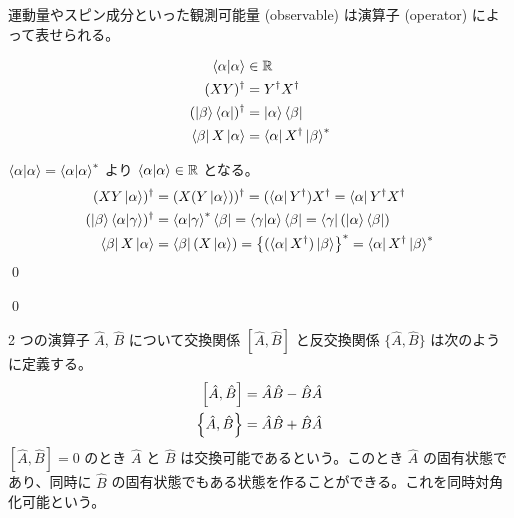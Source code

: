 \documentclass[uplatex,dvipdfmx,a4paper,11pt]{jlreq}
\makeatletter
\newcommand{\RR}{\mathbb{R}}
\theoremstyle{definition}
\renewenvironment{proof}[1][\proofname]{\par
  \normalfont
  \topsep6\p@\@plus6\p@ \trivlist
  \item[\hskip\labelsep{\bfseries #1}\@addpunct{\bfseries}]\ignorespaces\quad\par
}{%
  \qed\endtrivlist\@endpefalse
}
\renewcommand\proofname{証明}
\makeatother
\begin{document}
\begin{axiom}
  運動量やスピン成分といった観測可能量 (observable) は演算子 (operator) によって表せられる。
\end{axiom}

\begin{proposition}
  \begin{align}
    \braket{\alpha|\alpha}            & \in\RR                               \\
    (XY)^\dagger                      & = Y^\dagger X^\dagger                \\
    (\ket{\beta}\bra{\alpha})^\dagger & = \ket{\alpha}\bra{\beta}            \\
    \bra{\beta}X\ket{\alpha}          & = \bra{\alpha}X^\dagger\ket{\beta}^*
  \end{align}
\end{proposition}
\begin{proof}
  $\braket{\alpha|\alpha} = \braket{\alpha|\alpha}^*$ より $\braket{\alpha|\alpha}\in\RR$ となる。
  \begin{align}
    (XY\ket{\alpha})^\dagger                    & = (X(Y\ket{\alpha}))^\dagger = (\bra{\alpha}Y^\dagger)X^\dagger = \bra{\alpha}Y^\dagger X^\dagger                 \\
    (\ket{\beta}\braket{\alpha|\gamma})^\dagger & = \braket{\alpha|\gamma}^*\bra{\beta} = \braket{\gamma|\alpha}\bra{\beta} = \bra{\gamma}(\ket{\alpha}\bra{\beta}) \\
    \bra{\beta}X\ket{\alpha}                    & = \bra{\beta}(X\ket{\alpha}) = \qty{(\bra{\alpha}X^\dagger)\ket{\beta}}^* = \bra{\alpha}X^\dagger\ket{\beta}^*
  \end{align}
\end{proof}

\begin{theorem}[エルミート演算子の固有ケットの直交性]
\end{theorem}
\begin{proof}

\end{proof}

\begin{definition}
  2 つの演算子 $\hat{A}$, $\hat{B}$ について交換関係 $[\hat{A}, \hat{B}]$ と反交換関係 $\lbrace\hat{A}, \hat{B}\rbrace$ は次のように定義する。
  \begin{align}
    \qty[\hat{A}, \hat{B}] & = \hat{A}\hat{B} - \hat{B}\hat{A} \\
    \qty{\hat{A}, \hat{B}} & = \hat{A}\hat{B} + \hat{B}\hat{A}
  \end{align}
  $[\hat{A}, \hat{B}] = 0$ のとき $\hat{A}$ と $\hat{B}$ は交換可能であるという。このとき $\hat{A}$ の固有状態であり、同時に $\hat{B}$ の固有状態でもある状態を作ることができる。これを同時対角化可能という。
\end{definition}
\end{document}
